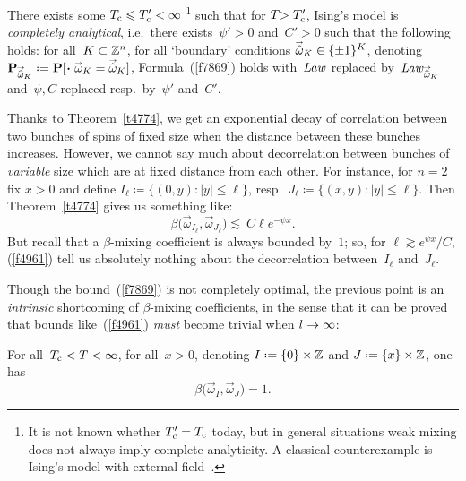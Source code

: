 \begin{Thm}\label{t4505}
There exists some $T_{\mathrm{c}}\leqslant T_{\mathrm{c}}'<\infty$%
\footnote{\label{Tc'=Tc?}It is not known whether $T_{\mathrm{c}}'=T_{\mathrm{c}}$ today,
but in general situations weak mixing does not always imply complete analyticity.
A classical counterexample is Ising's model with external field~\cite[\S~2]{MO}.}
such that for $T \allowbreak {>T_{\mathrm{c}}'}$,
Ising's model is \emph{completely analytical}, i.e.\ 
there exists~$\psi'>0$ and~$C'>0$ such that the following holds:
for all~$K\subset\mathbb{Z}^n$, for all `boundary' conditions $\vechat\omega_K \in \{\pm1\}^K$,
denoting $\Pr_{\vechat\omega_K} \coloneqq \Pr[\Bcdot|\vec\omega_K=\vechat\omega_K]$,
Formula~(\ref{f7869}) holds with~$\operatorname{\mathit{Law}}$ replaced by~$\Law_{\vechat\omega_K}$
and~$\psi, C$ replaced resp.\ by~$\psi'$ and~$C'$.
\end{Thm}

Thanks to Theorem~\ref{t4774}, we get an exponential decay of correlation
between two bunches of spins of fixed size when the distance between these bunches increases.
However, we cannot say much about decorrelation between bunches of \emph{variable} size
which are at fixed distance from each other.
For instance, for $n=2$ fix $x>0$ and define
$I_\ell \coloneqq \{(0,y) \colon |y|\leq \ell\}$, resp.\ $J_\ell \coloneqq \{(x,y) \colon {|y|\leq \ell}\}$.
Then Theorem~\ref{t4774} gives us something like:
\[\label{f4961}
\beta \big( \vec\omega_{I_\ell} , \vec\omega_{J_\ell} \big) \lesssim
\ C \ell e^{-\psi x} .\]
But recall that a $\beta$-mixing coefficient is always bounded by~$1$;
so, for $\ell \gtrsim e^{\psi x}/C$, (\ref{f4961}) tell us absolutely nothing about
the decorrelation between~$I_\ell$ and~$J_\ell$.

Though the bound~(\ref{f7869}) is not completely optimal,
the previous point is an \emph{intrinsic} shortcoming of $\beta$-mixing coefficients,
in the sense that it can be proved that bounds like~(\ref{f4961}) \emph{must} become trivial when
$l\to\infty$:
%
\begin{Thm}\label{c3793}
For all~$T_{\mathrm{c}}<T<\infty$, for all~$x>0$,
denoting $I \coloneqq \{0\}\times\ZZ$ and $J \coloneqq \{x\}\times\ZZ$,
one has
\[ \beta \big(\vec\omega_I , \vec\omega_J \big) = 1 .\]
\end{Thm}

